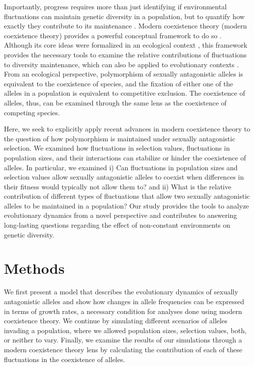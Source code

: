 \documentclass[12pt]{article}
\begin{document}
Importantly, progress requires more than just identifying if environmental fluctuations can maintain genetic diversity in a population, but to quantify how exactly they contribute to its maintenance \citep{ellner2016quantify}. Modern coexistence theory (modern coexistence theory) provides a powerful conceptual framework to do so \citep{Chesson2000,chesson1994multispecies, barabas_chessons_2018}. Although its core ideas were formalized in an ecological context \citep{chesson1994multispecies,chesson2000general}, this framework provides the necessary tools to examine the relative contributions of fluctuations to diversity maintenance, which can also be applied to evolutionary contexts  \citep{ellner1996patterns,reinhold2000maintenance}. From an ecological perspective, polymorphism of sexually antagonistic alleles is equivalent to the coexistence of species, and the fixation of either one of the alleles in a population is equivalent to competitive exclusion. The coexistence of alleles, thus, can be examined through the same lens as the coexistence of competing species.

Here, we seek to explicitly apply recent  advances in modern coexistence theory to the question of how
polymorphism is maintained under sexually antagonistic selection.  We examined how fluctuations in selection values, fluctuations in population sizes, and their interactions can stabilize or hinder the coexistence of alleles. In particular, we examined  i) Can fluctuations in population sizes and selection values allow sexually antagonistic alleles to coexist when differences in their fitness would typically not allow them to? and ii) What is the relative contribution of different types of fluctuations that allow two sexually antagonistic alleles to be maintained in a population? Our study provides the tools to analyze evolutionary dynamics from a novel perspective and contributes to answering long-lasting questions regarding the effect of non-constant environments on genetic diversity.



\section{Methods}

We first present  a model that describes the evolutionary dynamics of sexually antagonistic alleles and show how changes in allele frequencies can be expressed in terms of growth rates, a necessary condition for analyses done using modern coexistence theory. We continue by simulating different scenarios of alleles invading a population, where we allowed population sizes, selection values, both, or neither to vary. Finally, we examine the results of our simulations through a modern coexistence theory lens by calculating the contribution of each of these fluctuations in the coexistence of alleles.
\end{document}
